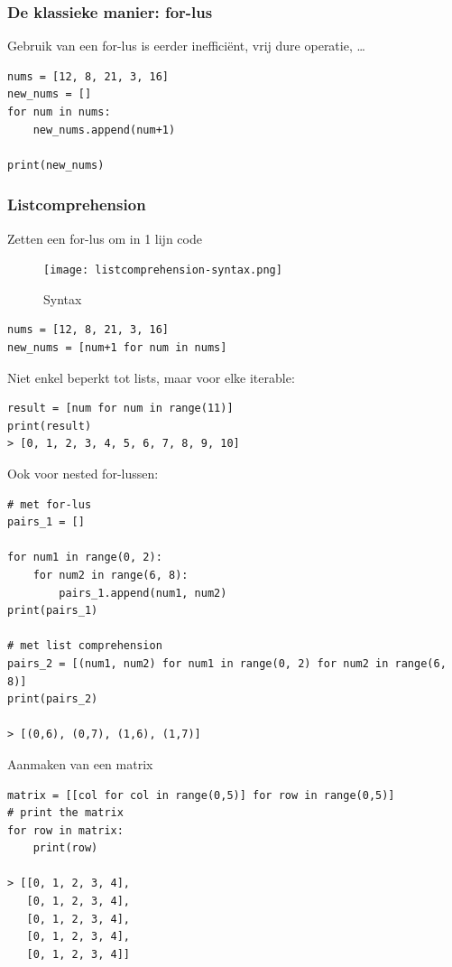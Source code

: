 \documentclass{article}
\begin{document}
\subsubsection{De klassieke manier: for-lus}

Gebruik van een for-lus is eerder inefficiënt, vrij dure operatie, \dots

\begin{verbatim}
nums = [12, 8, 21, 3, 16]
new_nums = []
for num in nums:
    new_nums.append(num+1)

print(new_nums)
\end{verbatim}

\subsubsection{Listcomprehension}

Zetten een for-lus om in 1 lijn code

\begin{figure}[H]
    \centering
    \texttt{[image: listcomprehension-syntax.png]}
    \caption{Syntax}
\end{figure}

\begin{verbatim}
nums = [12, 8, 21, 3, 16]
new_nums = [num+1 for num in nums]
\end{verbatim}

Niet enkel beperkt tot lists, maar voor elke iterable:

\begin{verbatim}
result = [num for num in range(11)]
print(result)
> [0, 1, 2, 3, 4, 5, 6, 7, 8, 9, 10]
\end{verbatim}

Ook voor nested for-lussen:

\begin{verbatim}
# met for-lus
pairs_1 = []

for num1 in range(0, 2):
    for num2 in range(6, 8):
        pairs_1.append(num1, num2)
print(pairs_1)

# met list comprehension
pairs_2 = [(num1, num2) for num1 in range(0, 2) for num2 in range(6, 8)]
print(pairs_2)

> [(0,6), (0,7), (1,6), (1,7)]
\end{verbatim}

Aanmaken van een matrix

\begin{verbatim}
matrix = [[col for col in range(0,5)] for row in range(0,5)]
# print the matrix
for row in matrix:
    print(row)

> [[0, 1, 2, 3, 4],
   [0, 1, 2, 3, 4],
   [0, 1, 2, 3, 4],
   [0, 1, 2, 3, 4],
   [0, 1, 2, 3, 4]]
\end{verbatim}
\end{document}
